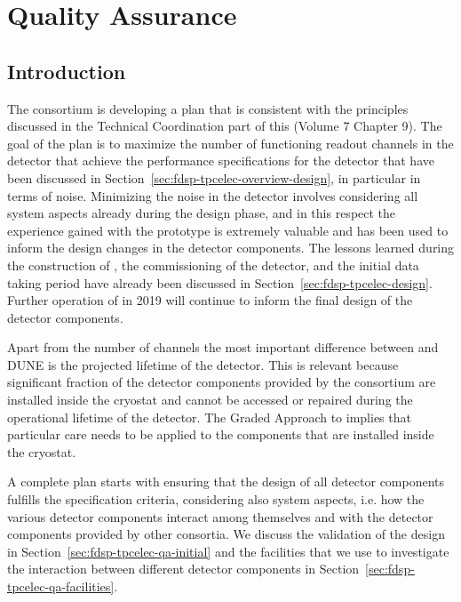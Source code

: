 \section{Quality Assurance}
\label{sec:fdsp-tpcelec-qa}

\subsection{Introduction}
\label{sec:fdsp-tpcelec-qa-introduction}

The  consortium is developing a  plan that is consistent
with the principles discussed in the Technical Coordination part of this 
 (Volume 7 Chapter 9). %
The goal of the  plan is to maximize the number of functioning
readout channels in the detector that achieve the performance specifications
for the detector that have been discussed in Section~\ref{sec:fdsp-tpcelec-overview-design},
in particular in terms of noise. Minimizing the noise in the detector involves
considering all system aspects already during the design phase, and in this
respect the experience gained with the  prototype is extremely
valuable and has been used to inform the design changes in the detector 
components. The lessons learned during the construction of ,
the commissioning of the detector, and the initial data taking period have
already been discussed in Section~\ref{sec:fdsp-tpcelec-design}. Further
operation of  in 2019 will continue to inform the final design
of the detector components.

Apart from the number of channels the most important difference
between  and DUNE is the projected lifetime of the detector. This
is relevant because significant fraction of the detector components provided 
by the  consortium are installed inside the cryostat and cannot 
be accessed or repaired during the operational lifetime of the detector. The 
Graded Approach to  implies that particular care needs to be applied
to the  components that are installed inside the cryostat.

A complete  plan starts with ensuring that the design of all
detector components fulfills the specification criteria, considering
also system aspects, i.e. how the various detector components interact
among themselves and with the detector components provided by other 
consortia. We discuss the validation of the design in 
Section~\ref{sec:fdsp-tpcelec-qa-initial} and the facilities that we use
to investigate the interaction between different detector components
in Section~\ref{sec:fdsp-tpcelec-qa-facilities}. 

